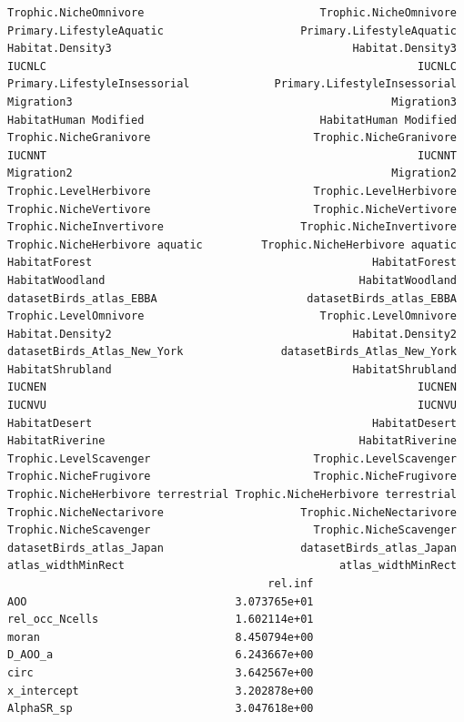 \documentclass[
  letterpaper,
  DIV=11,
  numbers=noendperiod]{scrartcl}
\begin{document}
\begin{verbatim}
Trophic.NicheOmnivore                           Trophic.NicheOmnivore
Primary.LifestyleAquatic                     Primary.LifestyleAquatic
Habitat.Density3                                     Habitat.Density3
IUCNLC                                                         IUCNLC
Primary.LifestyleInsessorial             Primary.LifestyleInsessorial
Migration3                                                 Migration3
HabitatHuman Modified                           HabitatHuman Modified
Trophic.NicheGranivore                         Trophic.NicheGranivore
IUCNNT                                                         IUCNNT
Migration2                                                 Migration2
Trophic.LevelHerbivore                         Trophic.LevelHerbivore
Trophic.NicheVertivore                         Trophic.NicheVertivore
Trophic.NicheInvertivore                     Trophic.NicheInvertivore
Trophic.NicheHerbivore aquatic         Trophic.NicheHerbivore aquatic
HabitatForest                                           HabitatForest
HabitatWoodland                                       HabitatWoodland
datasetBirds_atlas_EBBA                       datasetBirds_atlas_EBBA
Trophic.LevelOmnivore                           Trophic.LevelOmnivore
Habitat.Density2                                     Habitat.Density2
datasetBirds_Atlas_New_York               datasetBirds_Atlas_New_York
HabitatShrubland                                     HabitatShrubland
IUCNEN                                                         IUCNEN
IUCNVU                                                         IUCNVU
HabitatDesert                                           HabitatDesert
HabitatRiverine                                       HabitatRiverine
Trophic.LevelScavenger                         Trophic.LevelScavenger
Trophic.NicheFrugivore                         Trophic.NicheFrugivore
Trophic.NicheHerbivore terrestrial Trophic.NicheHerbivore terrestrial
Trophic.NicheNectarivore                     Trophic.NicheNectarivore
Trophic.NicheScavenger                         Trophic.NicheScavenger
datasetBirds_atlas_Japan                     datasetBirds_atlas_Japan
atlas_widthMinRect                                 atlas_widthMinRect
                                        rel.inf
AOO                                3.073765e+01
rel_occ_Ncells                     1.602114e+01
moran                              8.450794e+00
D_AOO_a                            6.243667e+00
circ                               3.642567e+00
x_intercept                        3.202878e+00
AlphaSR_sp                         3.047618e+00

\end{verbatim}
\end{document}
